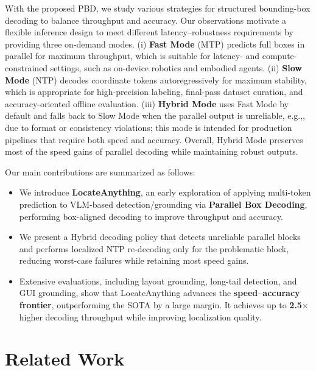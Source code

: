 \documentclass{llmxive}
\providecommand{\eg}{e.g.,\xspace}
\begin{document}
With the proposed PBD, we study various strategies for structured bounding-box decoding to balance throughput and accuracy. Our observations motivate a  flexible inference design to meet different latency--robustness requirements by providing three on-demand modes. (i) \textbf{Fast Mode} (MTP) predicts full boxes in parallel for maximum throughput, which is suitable for latency- and compute-constrained settings, such as on-device robotics and embodied agents. (ii) \textbf{Slow Mode} (NTP) decodes coordinate tokens autoregressively for maximum stability, which is appropriate for high-precision labeling, final-pass dataset curation, and accuracy-oriented offline evaluation. (iii) \textbf{Hybrid Mode} uses Fast Mode by default and falls back to Slow Mode when the parallel output is unreliable, \eg, due to format or consistency violations; this mode is intended for production pipelines that require both speed and accuracy. Overall, Hybrid Mode preserves most of the speed gains of parallel decoding while maintaining robust outputs.

\vspace{+1mm}
Our main contributions are summarized as follows:
\vspace{-2mm}
\begin{itemize}
\item We introduce \textbf{LocateAnything}, an early exploration of applying multi-token prediction to VLM-based detection/grounding via \textbf{Parallel Box Decoding}, performing box-aligned decoding to improve throughput and accuracy.
\item We present a Hybrid decoding policy that detects unreliable parallel blocks and performs localized NTP re-decoding only for the problematic block, reducing worst-case failures while retaining most speed gains.
\item Extensive evaluations, including layout grounding, long-tail detection, and GUI grounding, show that LocateAnything advances the \textbf{speed--accuracy frontier}, outperforming the SOTA by a large margin. It achieves up to \textbf{2.5$\times$} higher decoding throughput while improving localization quality.
\end{itemize}
\vspace{-2mm}

\section{Related Work} \label{sec:related}
\end{document}
